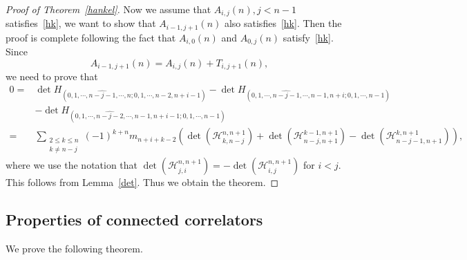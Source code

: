 \documentclass[a4paper]{article}
\theoremstyle{plain}
\theoremstyle{definition}
\newcommand{\nn}{\nonumber}
\begin{document}
\begin{proof}[Proof of Theorem~\ref{hankel}]
	Now we assume that $A_{i,j}(n),j<n-1$ satisfies~\eqref{hk}, we want to show that $A_{i-1,j+1}(n)$ also satisfies~\eqref{hk}. Then the proof is complete following the fact that $A_{i,0}(n)$ and $A_{0,j}(n)$ satisfy~\eqref{hk}. Since
	\begin{equation}
		A_{i-1,j+1}(n)=A_{i,j}(n)+T_{i,j+1}(n),
	\end{equation}
	we need to prove that
	\begin{align}
		0=&\det H_{(0,1,\cdots,\widehat{n-j-1},\cdots,n;0,1,\cdots,n-2,n+i-1)}-\det H_{(0,1,\cdots,\widehat{n-j-1},\cdots,n-1,n+i;0,1,\cdots,n-1)}\nn\\
		&-\det H_{(0,1,\cdots,\widehat{n-j-2},\cdots,n-1,n+i-1;0,1,\cdots,n-1)}\nn\\
		=&\sum_{\substack{2\le k\le n\\k\neq n-j}}(-1)^{k+n}m_{n+i+k-2}(\det(\mathcal H_{k,n-j}^{n,n+1})+\det(\mathcal H_{n-j,n+1}^{k-1,n+1})-\det(\mathcal H_{n-j-1,n+1}^{k,n+1})),
	\end{align}
	where we use the notation that $\det(\mathcal H_{j,i}^{n,n+1})=-\det(\mathcal H_{i,j}^{n,n+1})$ for $i<j$. This follows from Lemma~\ref{det}. Thus we obtain the theorem.
\end{proof}

\subsection{Properties of connected correlators} \label{section-rational}

We prove the following theorem.
\end{document}

